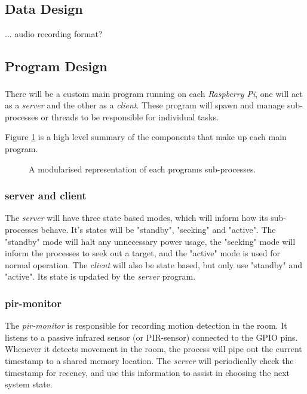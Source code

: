\documentclass[11pt,a4paper,titlepage]{report}
\newcommand{\rpi}{\textit{Raspberry Pi\textsuperscript{\textregistered}}}
\begin{document}
\subsection{Data Design}

... audio recording format?

\subsection{Program Design}

There will be a custom main program running on each \rpi, one will act as a \textit{server} and the other as a \textit{client}. These program will spawn and manage sub-processes or threads to be responsible for individual tasks.

Figure \ref{fig:processes} is a high level summary of the components that make up each main program.

\begin{figure}
\begin{multicols}{2}
\columnbreak
{}
\end{multicols}
\caption{A modularised representation of each programs sub-processes.}\label{fig:processes}
\end{figure}

\subsubsection{server and client}


The \textit{server} will have three state based modes, which will inform how its sub-processes behave. It's states will be "standby", "seeking" and "active". The "standby" mode will halt any unnecessary power usage, the "seeking" mode will inform the processes to seek out a target, and the "active" mode is used for normal operation. 
The \textit{client} will also be state based, but only use "standby" and "active". Its state is updated by the \textit{server} program.


\subsubsection{pir-monitor}

The \textit{pir-monitor} is responsible for recording motion detection in the room. It listens to a passive infrared sensor (or PIR-sensor) connected to the GPIO pins. Whenever it detects movement in the room, the process will pipe out the current timestamp to a shared memory location. The \textit{server} will periodically check the timestamp for recency, and use this information to assist in choosing the next system state.
\end{document}
